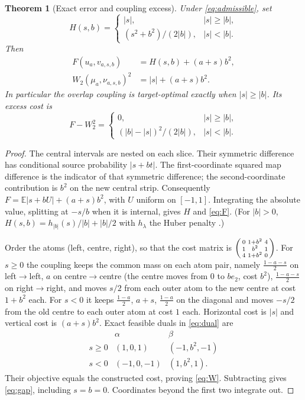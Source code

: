 \documentclass[11pt]{article}
\newtheorem{theorem}{Theorem}
\theoremstyle{remark}
\newcommand{\E}{\mathbb E}
\begin{document}
\begin{theorem}[Exact error and coupling excess]\label{thm:tilt}
Under \eqref{eq:admissible}, set
\[
 H(s,b)=\begin{cases}|s|,& |s|\geq|b|,\\
 (s^2+b^2)/(2|b|),& |s|<|b|.
 \end{cases}
\]
Then
\begin{align}
 F(u_a,v_{a,s,b})&=H(s,b)+(a+s)b^2,\label{eq:F}\\
 W_2(\mu_a,\nu_{a,s,b})^2&=|s|+(a+s)b^2.\label{eq:W}
\end{align}
In particular the overlap coupling is target-optimal exactly when
$|s|\geq|b|$. Its excess cost is
\begin{equation}\label{eq:gap}
 F-W_2^2=\begin{cases}0,& |s|\geq|b|,\\
 (|b|-|s|)^2/(2|b|),& |s|<|b|.
 \end{cases}
\end{equation}
\end{theorem}
\begin{proof}
The central intervals are nested on each slice. Their symmetric difference
has conditional source probability $|s+bt|$. The first-coordinate squared
map difference is the indicator of that symmetric difference; the
second-coordinate contribution is $b^2$ on the new central strip.
Consequently $F=\E|s+bU|+(a+s)b^2$, with $U$ uniform on $[-1,1]$.
Integrating the absolute value, splitting at $-s/b$ when it is internal,
gives $H$ and \eqref{eq:F}. (For $|b|>0$, $H(s,b)=h_{|b|}(s)/|b|+|b|/2$ with
$h_\lambda$ the Huber penalty \cite{RQS}.)

Order the atoms (left, centre, right), so that the cost matrix is
$\begin{psmallmatrix}0&1+b^2&4\\1&b^2&1\\4&1+b^2&0\end{psmallmatrix}$.
For $s\geq0$ the coupling keeps the common mass on each atom pair, namely
$\frac{1-a-s}{2}$ on left$\to$left, $a$ on centre$\to$centre (the centre moves
from $0$ to $be_2$, cost $b^2$), $\frac{1-a-s}{2}$ on right$\to$right, and
moves $s/2$ from each outer atom to the new centre at cost $1+b^2$ each. For
$s<0$ it keeps $\frac{1-a}{2}$, $a+s$, $\frac{1-a}{2}$ on the diagonal and
moves $-s/2$ from the old centre to each outer atom at cost $1$ each.
Horizontal cost is $|s|$ and vertical cost is $(a+s)b^2$. Exact feasible
duals in \eqref{eq:dual} are
\[
\begin{array}{c|cc}
 &\alpha&\beta\\\hline
 s\geq0&(1,0,1)&(-1,b^2,-1)\\
 s<0&(-1,0,-1)&(1,b^2,1).
\end{array}
\]
Their objective equals the constructed cost, proving \eqref{eq:W}.
Subtracting gives \eqref{eq:gap}, including $s=b=0$. Coordinates beyond
the first two integrate out.
\end{proof}
\end{document}
